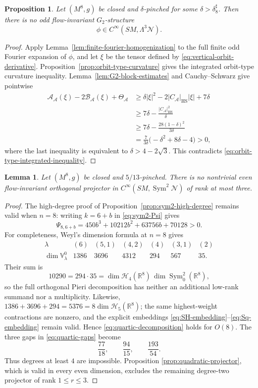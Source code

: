 \documentclass[reqno,11pt]{amsart}
\newtheorem{proposition}[theorem]{Proposition}
\newtheorem{lemma}[theorem]{Lemma}
\theoremstyle{definition}
\newcommand{\SM}{SM}
\newcommand{\cN}{\mathcal N}
\newcommand{\cA}{\mathcal A}
\newcommand{\Sym}{\operatorname{Sym}}
\newcommand{\bbR}{\mathbb R}
\newcommand{\Harm}{\mathscr H}
\begin{document}
\begin{proposition}
\label{prop:G2-eight-vanishing}
Let $(M^8,g)$ be closed and $\delta$-pinched for some
$\delta>\delta_8^\sharp$.  Then there is no odd flow-invariant
$G_2$-structure
$$
  \phi\in C^\infty(\SM,\Lambda^3\cN).
$$
\end{proposition}

\begin{proof}
Apply Lemma~\ref{lem:finite-fourier-homogenization} to the full finite odd
Fourier expansion of $\phi$, and let $\xi$ be the tensor defined by
\eqref{eq:vertical-orbit-derivative}.  Proposition~\ref{prop:orbit-type-curvature} gives the integrated
orbit-type curvature inequality.  Lemma~\ref{lem:G2-block-estimates} and
Cauchy--Schwarz give pointwise
\begin{align*}
 \mathscr A_{\cA}(\xi)-2\mathscr B_{\cA}(\xi)+\Theta_{\cA}
 &\geq
 \delta|\xi|^2-2|C_{\cA}|_{\mathrm{HS}}|\xi|+7\delta\\
 &\geq
 7\delta-\frac{|C_{\cA}|_{\mathrm{HS}}^2}{\delta}\\
 &\geq
 7\delta-\frac{28(1-\delta)^2}{3\delta}\\
 &=\frac7{3\delta}\bigl(-\delta^2+8\delta-4\bigr)>0,
\end{align*}
where the last inequality is equivalent to
$\delta>4-2\sqrt3$.  This contradicts
\eqref{eq:orbit-type-integrated-inequality}.
\end{proof}

\begin{lemma}
\label{lem:projector-eight}
Let $(M^8,g)$ be closed and $5/13$-pinched.  There is no nontrivial even
flow-invariant orthogonal projector in
$C^\infty(\SM,\Sym^2\cN)$ of rank at most three.
\end{lemma}

\begin{proof}
The high-degree proof of Proposition~\ref{prop:sym2-high-degree} remains
valid when $n=8$: writing $k=6+b$ in \eqref{eq:sym2-Psi} gives
$$
  \Psi_{8,6+b}
  =450b^3+10212b^2+63756b+70128>0.
$$
For completeness, Weyl's dimension formula at $n=8$ gives
$$
\begin{array}{c|rrrrrr}
 \lambda&(6)&(5,1)&(4,2)&(4)&(3,1)&(2)\\ \hline
 \dim\mathbb V^0_\lambda&1386&3696&4312&294&567&35.
\end{array}
$$
Their sum is
$$
 10290=294\cdot35
 =\dim\Harm_4(\bbR^8)\,\dim\Sym^2_0(\bbR^8),
$$
so the full orthogonal Pieri decomposition has neither an additional
low-rank summand nor a multiplicity.  Likewise,
$1386+3696+294=5376=8\dim\Harm_5(\bbR^8)$; the same highest-weight
contractions are nonzero, and the explicit embeddings
\eqref{eq:SH-embedding}--\eqref{eq:Sq-embedding} remain valid.  Hence
\eqref{eq:quartic-decomposition} holds for $O(8)$.  The three gaps in
\eqref{eq:quartic-gaps} become
$$
  \frac{77}{18},\qquad \frac{94}{15},\qquad \frac{193}{54}.
$$
Thus degrees at least $4$ are impossible.  Proposition
\ref{prop:quadratic-projector}, which is valid in every even dimension,
excludes the remaining degree-two projector of rank $1\leq r\leq3$.
\end{proof}
\end{document}
